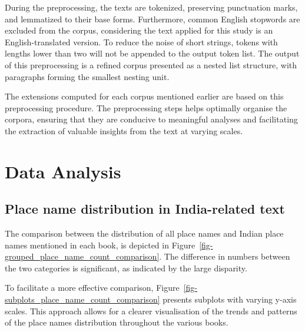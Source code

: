 \documentclass[
  12pt,
]{article}
\begin{document}
During the preprocessing, the texts are tokenized, preserving
punctuation marks, and lemmatized to their base forms. Furthermore,
common English stopwords are excluded from the corpus, considering the
text applied for this study is an English-translated version. To reduce
the noise of short strings, tokens with lengths lower than two will not
be appended to the output token list. The output of this preprocessing
is a refined corpus presented as a nested list structure, with
paragraphs forming the smallest nesting unit.

The extensions computed for each corpus mentioned earlier are based on
this preprocessing procedure. The preprocessing steps helps optimally
organise the corpora, ensuring that they are conducive to meaningful
analyses and facilitating the extraction of valuable insights from the
text at varying scales.

\newpage

\hypertarget{data-analysis}{%
\section{Data Analysis}\label{data-analysis}}

\hypertarget{place-name-distribution-in-india-related-text}{%
\subsection{Place name distribution in India-related
text}\label{place-name-distribution-in-india-related-text}}

The comparison between the distribution of all place names and Indian
place names mentioned in each book, is depicted in
Figure~\ref{fig-grouped_place_name_count_comparison}. The difference in
numbers between the two categories is significant, as indicated by the
large disparity.

To facilitate a more effective comparison,
Figure~\ref{fig-subplots_place_name_count_comparison} presents subplots
with varying y-axis scales. This approach allows for a clearer
visualisation of the trends and patterns of the place names distribution
throughout the various books.
\end{document}
